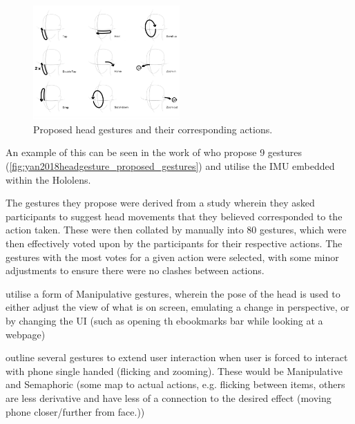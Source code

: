 \begin{figure}
    \centering
    \includegraphics[width=0.5\textwidth]{figures/yan2018headgesture_fig2_proposed_gestures.png}
    \caption{\label{fig:yan2018headgesture_proposed_gestures} Proposed head gestures and their corresponding actions\cite{yan2018headgesture}.}
\end{figure}
An example of this can be seen in the work of \citeauthor{yan2018headgesture} who propose 9 gestures (\autoref{fig:yan2018headgesture_proposed_gestures}) and utilise the IMU embedded within the Hololens\cite{yan2018headgesture}.

The gestures they propose were derived from a study wherein they asked participants to suggest head movements that they believed corresponded to the action taken.
These were then collated by manually into 80 gestures, which were then effectively voted upon by the participants for their respective actions.
The gestures with the most votes for a given action were selected, with some minor adjustments to ensure there were no clashes between actions.

\cite{lopez2012head} utilise a form of Manipulative gestures, wherein the pose of the head is used to either adjust the view of what is on screen, emulating a change in perspective, or by changing the UI (such as opening th ebookmarks bar while looking at a webpage)

\citeauthor{kong2021eyemu} outline several gestures to extend user interaction when user is forced to interact with phone single handed (flicking and zooming).
These would be Manipulative and Semaphoric (some map to actual actions, e.g. flicking between items, others are less derivative and have less of a connection to the desired effect (moving phone closer/further from face.))

